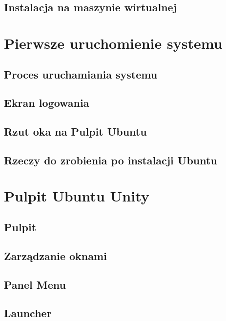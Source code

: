\documentclass[a4paper,11pt,oneside]{mwart}
\begin{document}
	\subsection{Instalacja na maszynie wirtualnej}
				
\section{Pierwsze uruchomienie systemu}
	\label{sec:pierwsze_uruchomienie}
	\subsection{Proces uruchamiania systemu}
		
	\subsection{Ekran logowania}
	\subsection{Rzut oka na Pulpit Ubuntu}
	\subsection{Rzeczy do zrobienia po instalacji Ubuntu}
		\label{sec:rzeczy_do_zrobienia_po_instalacji}
\section{Pulpit Ubuntu Unity}
	\subsection{Pulpit}
	\subsection{Zarządzanie oknami}
	\subsection{Panel Menu}
	\subsection{Launcher}
\end{document}
